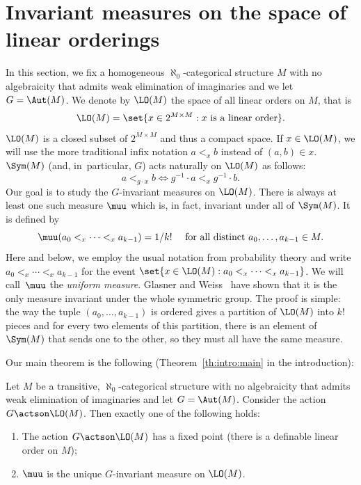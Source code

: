 
\section{Invariant measures on the space of linear orderings}
\label{sec:invar-meas-space}

In this section, we fix a homogeneous $\aleph_0$-categorical structure $M$ with no algebraicity that admits weak elimination of imaginaries and we let $G = \Aut(M)$. We denote by $\LO(M)$ the space of all linear orders on $M$, that is
\begin{equation*}
\LO(M) = \set{x \in 2^{M \times M} : x \text{ is a linear order}}.
\end{equation*}
$\LO(M)$ is a closed subset of $2^{M \times M}$ and thus a compact space. If $x \in \LO(M)$, we will use the more traditional infix notation $a <_x b$ instead of $(a, b) \in x$. $\Sym(M)$ (and, in~particular, $G$) acts naturally on $\LO(M)$ as follows:
\begin{equation*}
a <_{g \cdot x} b \iff g^{-1} \cdot a <_x g^{-1} \cdot b.
\end{equation*}
Our goal is to study the $G$-invariant measures on $\LO(M)$. There is always at least one such measure $\muu$ which is, in fact, invariant under all of $\Sym(M)$. It is defined by
\begin{equation*}
\muu(a_0 <_x \cdots <_x a_{k-1}) = 1/k! \quad \text{ for all distinct } a_0, \ldots, a_{k-1} \in M.
\end{equation*}
Here and below, we employ the usual notation from probability theory and write $a_0 <_x \cdots <_x a_{k-1}$ for the event $\set{x \in \LO(M) : a_0 <_x \cdots <_x a_{k-1}}$. We will call~$\muu$ the \emph{uniform measure}. Glasner and Weiss~\cite{Glasner2002a} have shown that it is the only measure invariant under the whole symmetric group. The proof is simple: the way the tuple $(a_0, \ldots, a_{k-1})$ is ordered gives a partition of $\LO(M)$ into $k!$ pieces and for every two elements of this partition, there is an element of $\Sym(M)$ that sends one to the other, so they must all have the same measure.

Our main theorem is the following (\cf Theorem~\ref{th:intro:main} in the introduction):
\begin{theorem}
\label{Thm:Princip} Let $M$ be a transitive, $\aleph_0$-categorical structure with no algebraicity that admits weak elimination of imaginaries and let $G=\Aut(M)$. Consider the action $G \actson \LO(M)$. Then exactly one of the following holds:
\begin{enumerate}
\item The action $G \actson \LO(M)$ has a fixed point (\ie there is a definable linear order on $M$);
\item $\muu$ is the unique $G$-invariant measure on $\LO(M)$.
\end{enumerate}
\end{theorem}

